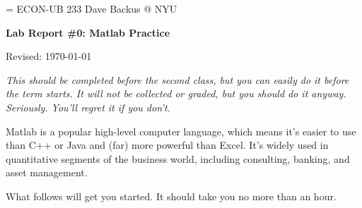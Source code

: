 \documentclass[11pt]{exam}
\begin{document}
\parskip=\bigskipamount
\parindent=0.0in
\thispagestyle{empty}
{\large ECON-UB 233 \hfill Dave Backus @ NYU}

\bigskip\bigskip
\centerline{\Large \bf Lab Report \#0:  Matlab Practice}
\centerline{Revised: \today}

\bigskip
{\it This should be completed before the second class,
but you can easily do it before the term starts.
It will not be collected or graded, but you should do it anyway.
Seriously. You'll regret it if you don't.}

Matlab is a popular high-level computer language,
which means it's easier to use than C++ or Java
and (far) more powerful than Excel.
It's widely used in quantitative segments of the business world,
including consulting, banking, and asset management.

What follows will get you started.  It should take you no more than an hour.
%
\end{document}
